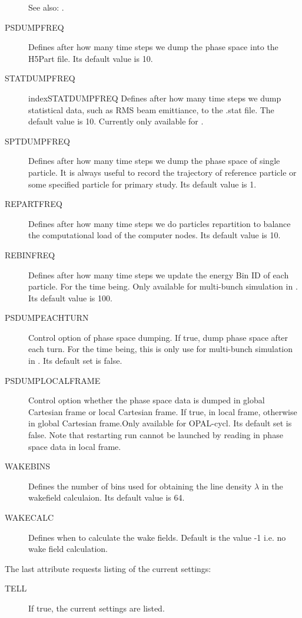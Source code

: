 \begin{description}
  See also: .
\item[PSDUMPFREQ]
   Defines after how many time steps we dump the phase space into the H5Part file. Its default value is 10. 
\item[STATDUMPFREQ]
 index{STATDUMPFREQ}
 	Defines after how many time steps we dump statistical data, such as RMS beam emittiance, to the .stat file.
 	The default value is 10. Currently only available for \opalt.
\item[SPTDUMPFREQ]
   Defines after how many time steps we dump the phase space of single particle.
   It is always useful to record the trajectory of reference particle
   or some specified particle for primary study. Its default value is 1.  
\item[REPARTFREQ]
   Defines after how many time steps we do particles repartition to balance the computational load of  
   the computer nodes. Its default value is 10.  
   
\item[REBINFREQ]
   Defines after how many time steps we update the energy Bin ID of each particle. For the time being. 
   Only available for multi-bunch simulation in \opalcycl. Its default value is 100.  

\item[PSDUMPEACHTURN]
 Control option of phase space dumping. If true, dump phase space after each turn. 
 For the time being, this is only use for multi-bunch simulation in \opalcycl. Its default set is false. 

\item[PSDUMPLOCALFRAME]
 Control option whether the phase space data is dumped in global Cartesian frame or local Cartesian frame.
 If true, in local frame, otherwise in global Cartesian frame.Only available for OPAL-cycl. Its default set is false.
 Note that restarting run cannot be launched by reading in phase space data in local frame.
     
 \item[WAKEBINS]
   Defines the number of bins used for obtaining the line density $\lambda$ in the wakefield calculaion.
Its default value is 64. 

\item[WAKECALC]
   Defines when to calculate the wake fields.  Default is the value -1 i.e. no wake field calculation. 
\end{description}
The last attribute requests listing of the current settings:
\begin{description}
\item[TELL]
  If true, the current settings are listed.
\end{description}

